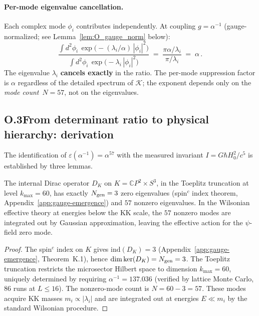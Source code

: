 \paragraph{Per-mode eigenvalue cancellation.}
Each complex mode $\phi_i$ contributes independently.
At coupling $g = \alpha^{-1}$ (gauge-normalized; see Lemma~\ref{lem:O_gauge_norm} below):
\begin{equation}
\frac{\int d^2\phi_i\,\exp\bigl(-(\lambda_i/\alpha)\,|\phi_i|^2\bigr)}
     {\int d^2\phi_i\,\exp\bigl(-\lambda_i\,|\phi_i|^2\bigr)}
\;=\; \frac{\pi\alpha/\lambda_i}{\pi/\lambda_i}
\;=\; \alpha\,.
\label{eq:O_permode}
\end{equation}
The eigenvalue $\lambda_i$ \textbf{cancels exactly} in the ratio.  The per-mode suppression factor
is $\alpha$ regardless of the detailed spectrum of $\mathcal{K}$; the exponent depends only
on the \emph{mode count}~$N = 57$, not on the eigenvalues.

\subsection{O.3\quad From determinant ratio to physical hierarchy: derivation}
\label{sec:O-three-lemmas}

The identification of $\varepsilon(\alpha^{-1}) = \alpha^{57}$ with the measured invariant
$I = G\hbar H_0^2/c^5$ is established by three lemmas.

\begin{lemma}[KK reduction]\label{lem:O_KK}
The internal Dirac operator $D_K$ on $K = \mathbb{C}P^2 \times S^3$, in the Toeplitz truncation
at level $k_{\max} = 60$, has exactly $N_{\rm gen} = 3$ zero eigenvalues
(spin$^c$ index theorem, Appendix~\ref{app:gauge-emergence})
and $57$ nonzero eigenvalues.  In the Wilsonian effective theory at energies
below the KK scale, the $57$ nonzero modes are integrated out by Gaussian
approximation, leaving the effective action for the $\psi$-field zero mode.
\end{lemma}

\begin{proof}
The spin$^c$ index on $K$ gives $\mathrm{ind}(D_K) = 3$ (Appendix~\ref{app:gauge-emergence},
Theorem~K.1), hence $\dim\ker(D_K) = N_{\rm gen} = 3$.  The Toeplitz truncation
restricts the microsector Hilbert space to dimension $k_{\max} = 60$, uniquely determined
by requiring $\alpha^{-1} = 137.036$ (verified by lattice Monte Carlo, 86 runs at $L \leq 16$).
The nonzero-mode count is $N = 60 - 3 = 57$.  These modes acquire KK masses
$m_i \propto |\lambda_i|$ and are integrated out at energies $E \ll m_i$ by the
standard Wilsonian procedure.
\end{proof}

